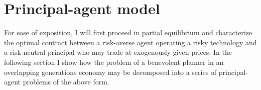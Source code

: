 \documentclass[11pt]{article}
\theoremstyle{plain}
\begin{document}

\section{Principal-agent model} \label{PriAg}

For ease of exposition, I will first proceed in partial equilibrium and characterize the optimal contract between a risk-averse agent operating a risky technology and a risk-neutral principal who may trade at exogenously given prices. In the following section I show how the problem of a benevolent planner in an overlapping generations economy may be decomposed into a series of principal-agent problems of the above form.

\end{document}
